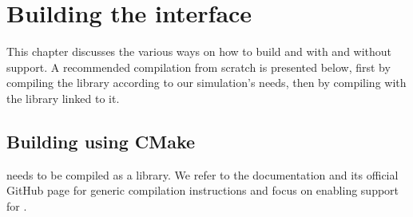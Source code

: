 \chapter{Building the interface}
\label{ch:p1:building}







This chapter discusses the various ways on how to build \quda and \openqxd with and without \quda support. A recommended compilation from scratch is presented below, first by compiling the \quda library according to our simulation's needs, then by compiling \openqxd with the \quda library linked to it.

\section{Building \quda using CMake}
\label{sec:building:quda}

\Quda needs to be compiled as a library. We refer to the \quda documentation \cite{QUDApaper} and its official GitHub page \cite{github:quda} for generic compilation instructions and focus on enabling support for \openqxd.

